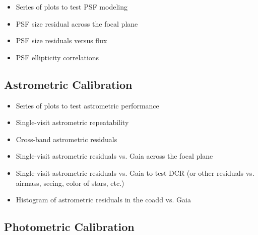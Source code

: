 \begin{itemize}

\item Series of plots to test PSF modeling

\item PSF size residual across the focal plane

\item PSF size residuals versus flux

\item PSF ellipticity correlations

\end{itemize}

\subsection{Astrometric Calibration}

\begin{itemize}

\item Series of plots to test astrometric performance

\item Single-visit astrometric repeatability

\item Cross-band astrometric residuals

\item Single-visit astrometric residuals vs. Gaia across the focal plane

\item Single-visit astrometric residuals vs. Gaia to test DCR (or other residuals vs. airmass, seeing, color of stars, etc.)

\item Histogram of astrometric residuals in the coadd vs. Gaia

\end{itemize}



\subsection{Photometric Calibration}

